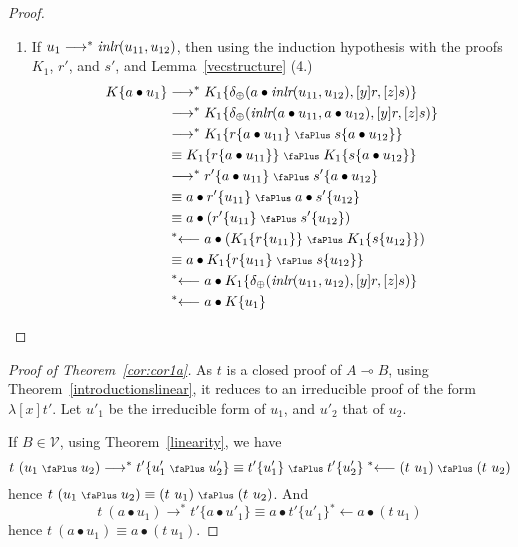 \documentclass[screen, sigconf,authorversion,nonacm]{acmart}
\theoremstyle{acmdefinition}
\numberwithin{equation}{section}
\newcommand\abstr[1]{[#1]}
\newcommand\inlr{\mbox{\it inlr}}
\newcommand\plus{\mathrel{\text{\normalfont\scalebox{0.7}{\faPlus}}}}
\newcommand\lra{\longrightarrow}
\newcommand\lras{\lra^*}
\newcommand\llas{\mathrel{{}^*{\longleftarrow}}}
\newcommand\elimplus{\delta_{\oplus}}
\begin{document}
\begin{proof}
\begin{itemize}
\begin{itemize}
\begin{enumerate}
       \item If $u_1 \lras \inlr(u_{11},u_{12})$, then using the
              induction hypothesis with the proofs $K_1$, $r'$, and
              $s'$, and Lemma~\ref{vecstructure} (4.)
	  \begin{align*}
	    K\{a \bullet u_1\}
	    &\lras K_1 \{\elimplus(a \bullet \inlr(u_{11},u_{12}),\abstr{y}r,\abstr{z}s)\}\\
	    &\lras K_1 \{\elimplus(\inlr(a \bullet u_{11},a \bullet u_{12}), \abstr{y}r,\abstr{z}s)\}\\
	    &\lras K_1 \{r\{a \bullet u_{11}\} \plus s\{a \bullet u_{12}\}\}\\
      	    &\equiv K_1 \{r\{a \bullet u_{11}\}\} \plus K_1\{s\{a \bullet u_{12}\}\}\\
            &\lras r'\{a \bullet u_{11}\} \plus s'\{a \bullet u_{12}\}\\
            & \equiv a \bullet r'\{u_{11}\} \plus a \bullet s'\{u_{12}\}\\
            & \equiv a \bullet (r'\{u_{11}\} \plus s'\{u_{12}\})\\
	    &\llas a \bullet (K_1 \{r\{u_{11}\}\} \plus K_1 \{s\{u_{12}\}\})\\
       	    &\equiv a \bullet K_1 \{r\{u_{11}\} \plus s\{u_{12}\}\}\\
            &\llas a \bullet K_1 \{\elimplus(\inlr(u_{11},u_{12}),\abstr{y}r,\abstr{z}s)\}\\
	    & \llas a \bullet K\{u_1\}
 \tag*{\qedhere}
\end{align*}
\end{enumerate}
\end{itemize}
\end{itemize}
\end{proof}


\begin{proof}[Proof of Theorem~\ref{cor:cor1a}]
  As $t$ is a closed proof of $A \multimap B$, using
  Theorem~\ref{introductionslinear}, it reduces to an irreducible proof of the
  form $\lambda \abstr{x} t'$.  Let $u'_1$ be the irreducible form of
  $u_1$, and $u'_2$ that of $u_2$.

If $B \in {\mathcal V}$, using Theorem~\ref{linearity}, we have
\[
t~(u_1 \plus u_2) \lras t'\{u'_1 \plus u'_2\} \equiv t'\{u'_1\} \plus t'\{u'_2\} \llas (t~u_1) \plus (t~u_2)
\]
hence 
\(
t~(u_1 \plus u_2)  \equiv  (t~u_1) \plus (t~u_2)
\).
And
\[
 t~(a\bullet u_1) \lras t'\{a \bullet u'_1\} \equiv a \bullet t'\{u'_1\} \llas a\bullet (t~u_1)
 \]
 hence
\(
 t~(a\bullet u_1)  \equiv  a\bullet (t~u_1)
 \).
  \qedhere
\end{proof}
\end{document}
